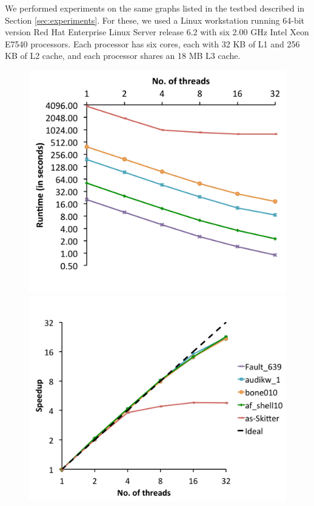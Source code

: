 We performed experiments on the same graphs listed in the testbed described in Section \ref{sec:experiments}. For these, we used a Linux workstation running 64-bit version Red Hat Enterprise Linux Server release 6.2 with six 2.00 GHz Intel Xeon E7540 processors. Each processor has six cores, each with 32 KB of L1 and 256 KB of L2 cache, and each processor shares an 18 MB L3 cache.  


\begin{figure}
  \centering
    \includegraphics[scale=0.17]{parallel_realworld_timing.pdf}
    \includegraphics[scale=0.17]{parallel_realworld_speedup.pdf}

\end{figure}
